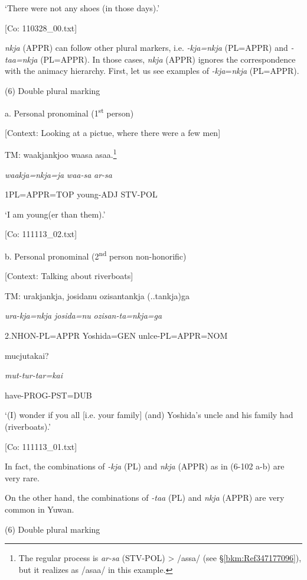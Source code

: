       ‘There were not any shoes (in those days).’

      [Co: 110328\_00.txt]

  \textit{nkja} (APPR) can follow other plural markers, i.e. \textit{{}-kja=nkja} (PL=APPR) and \textit{{}-taa=nkja} (PL=APPR). In those cases, \textit{nkja} (APPR) ignores the correspondence with the animacy hierarchy. First, let us see examples of \textit{{}-kja}=\textit{nkja} (PL=APPR).

(6)  Double plural marking

  a.  Personal pronominal (1\textsuperscript{st} person)

    [Context: Looking at a pictue, where there were a few men]

    TM:  waakjankjoo  waasa  asaa.\footnote{The regular process is \textit{ar-sa} (STV-POL) > /assa/ (see §\ref{bkm:Ref347177096}), but it realizes as /asaa/ in this example.}

      \textit{waakja=nkja=ja}  \textit{waa-sa}  \textit{ar-sa}

      1PL=APPR=TOP  young-ADJ  STV-POL

      ‘I am young(er than them).’

      [Co: 111113\_02.txt]

  b.  Personal pronominal (2\textsuperscript{nd} person non-honorific)

    [Context: Talking about riverboats]

    TM:  urakjankja,  josidanu  ozisantankja (..tankja)ga

      \textit{ura-kja=nkja}  \textit{josida=nu}  \textit{ozisan-ta=nkja=ga}

      2.NHON-PL=APPR  Yoshida=GEN  unlce-PL=APPR=NOM

      mucjutakai?

      \textit{mut-tur-tar=kai}

      have-PROG-PST=DUB

      ‘(I) wonder if you all [i.e. your family] (and) Yoshida’s uncle and his family had (riverboats).’

      [Co: 111113\_01.txt]

In fact, the combinations of \textit{{}-kja} (PL) and \textit{nkja} (APPR) as in (6-102 a-b) are very rare.

On the other hand, the combinations of \textit{{}-taa} (PL) and \textit{nkja} (APPR) are very common in Yuwan.

(6)  Double plural marking

